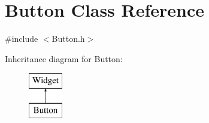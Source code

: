 \hypertarget{class_button}{}\section{Button Class Reference}
\label{class_button}


{\ttfamily \#include $<$Button.\+h$>$}

Inheritance diagram for Button\+:\begin{figure}[H]
\begin{center}
\leavevmode
\includegraphics[height=2.000000cm]{class_button}
\end{center}
\end{figure}
